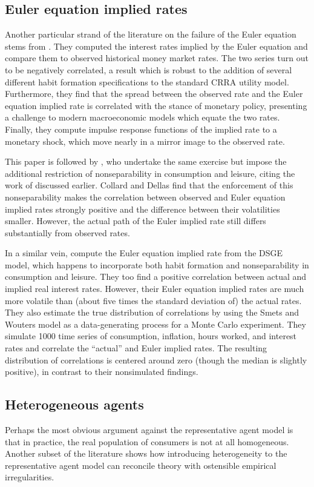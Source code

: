 \subsection{Euler equation implied rates}
Another particular strand of the literature on the failure of the Euler equation stems from \cite{canzoneri07}. They computed the interest rates implied by the Euler equation and compare them to observed historical money market rates. The two series turn out to be negatively correlated, a result which is robust to the addition of several different habit formation specifications to the standard CRRA utility model. Furthermore, they find that the spread between the observed rate and the Euler equation implied rate is correlated with the stance of monetary policy, presenting a challenge to modern macroeconomic models which equate the two rates. Finally, they compute impulse response functions of the implied rate to a monetary shock, which move nearly in a mirror image to the observed rate.

This paper is followed by \cite{collard11}, who undertake the same exercise but impose the additional restriction of nonseparability in consumption and leisure, citing the work of \cite{basu02} discussed earlier. Collard and Dellas find that the enforcement of this nonseparability makes the correlation between observed and Euler equation implied rates strongly positive and the difference between their volatilities smaller. However, the actual path of the Euler implied rate still differs substantially from observed rates.

In a similar vein, \cite{gareis13} compute the Euler equation implied rate from the \cite{smets07} DSGE model, which happens to incorporate both habit formation and nonseparability in consumption and leisure. They too find a positive correlation between actual and implied real interest rates. However, their Euler equation implied rates are much more volatile than (about five times the standard deviation of) the actual rates. They also estimate the true distribution of correlations by using the Smets and Wouters model as a data-generating process for a Monte Carlo experiment. They simulate 1000 time series of consumption, inflation, hours worked, and interest rates and correlate the ``actual'' and Euler implied rates. The resulting distribution of correlations is centered around zero (though the median is slightly positive), in contrast to their nonsimulated findings.



\subsection{Heterogeneous agents}
Perhaps the most obvious argument against the representative agent model is that in practice, the real population of consumers is not at all homogeneous. Another subset of the literature shows how introducing heterogeneity to the representative agent model can reconcile theory with ostensible empirical irregularities.


